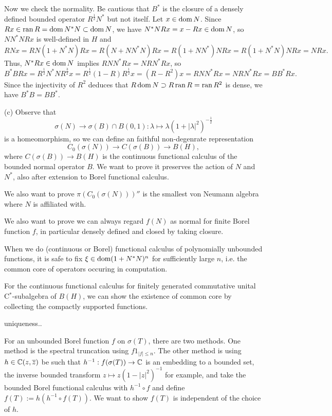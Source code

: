 \documentclass{../../large}
\begin{document}
\begin{pf}
Now we check the normality.
Be cautious that $B^*$ is the closure of a densely defined bounded operator $R^{\frac12}N^*$ but not itself.
Let $x\in\operatorname{dom} N$.
Since $Rx\in\operatorname{ran} R=\operatorname{dom} N^*N\subset\operatorname{dom} N$, we have $N^*NRx=x-Rx\in\operatorname{dom} N$, so $NN^*NRx$ is well-defined in $H$ and
\[RNx=RN(1+N^*N)Rx=R(N+NN^*N)Rx=R(1+NN^*)NRx=R(1+N^*N)NRx=NRx.\]
Thus, $N^*Rx\in\operatorname{dom} N$ implies $RNN^*Rx=NRN^*Rx$, so
\[B^*BRx=R^{\frac12}N^*NR^{\frac32}x=R^{\frac12}(1-R)R^{\frac12}x=(R-R^2)x=RNN^*Rx=NRN^*Rx=BB^*Rx.\]
Since the injectivity of $R^2$ deduces that $R\operatorname{dom} N\supset R\operatorname{ran} R=\operatorname{ran} R^2$ is dense, we have $B^*B=BB^*$.



(c)
Observe that
\[\sigma(N)\to\sigma(B)\cap B(0,1):\lambda\mapsto\lambda(1+|\lambda|^2)^{-\frac12}\]
is a homeomorphism, so we can define an faithful non-degenrate representation
\[C_0(\sigma(N))\to C(\sigma(B))\to B(H),\]
where $C(\sigma(B))\to B(H)$ is the continuous functional calculus of the bounded normal operator $B$.
We want to prove it preserves the action of $N$ and $N^*$, also after extension to Borel functional calculus.

We also want to prove $\pi(C_0(\sigma(N)))''$ is the smallest von Neumann algebra where $N$ is affiliated with.

We also want to prove we can always regard $f(N)$ as normal for finite Borel function $f$, in particular densely defined and closed by taking closure.


When we do (continuous or Borel) functional calculus of polynomially unbounded functions, it is safe to fix $\xi\in\operatorname{dom}(1+N^*N)^n$ for sufficiently large $n$, i.e. the common core of operators occuring in computation.

For the continuous functional calculus for finitely generated commutative unital C$^*$-subalgebra of $B(H)$, we can show the existence of common core by collecting the compactly supported functions.


uniqueness..


\end{pf}



\begin{prb}
For an unbounded Borel function $f$ on $\sigma(T)$, there are two methods.
One method is the spectral truncation using $f1_{|f|\le n}$.
The other method is using $h\in\mathbb{C}(z,\overline z)$ be such that $h^{-1}:f(\sigma(T))\to\mathbb{C}$ is an embedding to a bounded set, the inverse bounded transform $z\mapsto z(1-|z|^2)^{-1}$ for example, and take the bounded Borel functional calculus with $h^{-1}\circ f$ and define $f(T):=h(h^{-1}\circ f(T))$.
We want to show $f(T)$ is independent of the choice of $h$.
\begin{parts}
\item 
\end{parts}
\end{prb}
\end{document}

